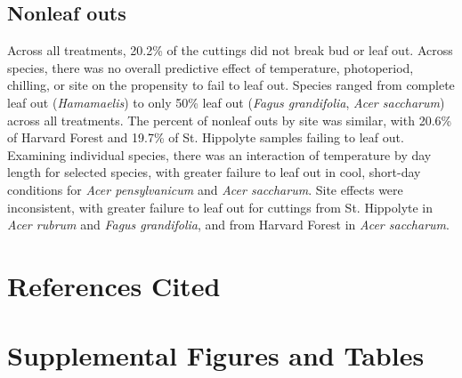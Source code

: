 \documentclass{article}
\begin{document}
\subsection*{Nonleaf outs}
Across all treatments, 20.2\% of the cuttings did not break bud or leaf out. Across species, there was no overall predictive effect of temperature, photoperiod, chilling, or site on the propensity to fail to leaf out. Species ranged from complete leaf out (\emph{Hamamaelis}) to only 50\% leaf out (\emph{Fagus grandifolia}, \emph{Acer saccharum}) across all treatments. The percent of nonleaf outs by site was similar, with 20.6\% of Harvard Forest and 19.7\% of St. Hippolyte samples failing to leaf out. Examining individual species,  there was an interaction of temperature by day length for selected species, with greater failure to leaf out in cool, short-day conditions for \emph{Acer pensylvanicum}  and \emph{Acer saccharum}. Site effects were inconsistent, with greater failure to leaf out for cuttings from St. Hippolyte in \emph{Acer rubrum} and \emph{Fagus grandifolia}, and from Harvard Forest in \emph{Acer saccharum}. 

\section*{References Cited}




\section*{Supplemental Figures and Tables}
\end{document}
